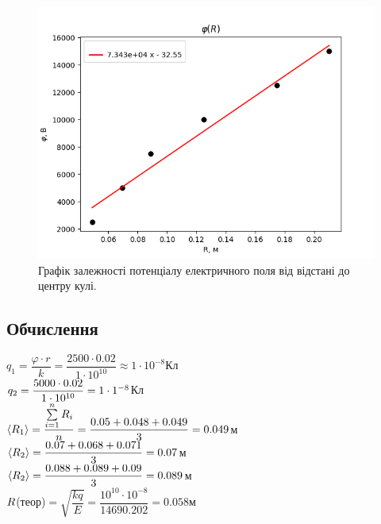 \documentclass[a4paper,12pt]{article}
\begin{document}
\newpage
	\begin{figure}[h!]
		\centering
		\begin{minipage}[h]{1\linewidth}
			\includegraphics[width=1\linewidth]{Prt sc/Figure_1.png}
			\caption{Графік залежності потенціалу електричного поля від відстані до центру кулі.}
			\label{Figure_1}
		\end{minipage}
	\end{figure}
	
	
	\subsection*{Обчислення}
	$q_1=\dfrac{\varphi\cdot r}{k}=\dfrac{2500\cdot0.02}{1\cdot10^{10}}\approx1\cdot10^{-8}$Кл \\
	$\\ q_2=\dfrac{5000\cdot0.02}{1\cdot10^{10}}=1\cdot1^{-8}$Кл \\
	$\\ \langle R_1\rangle=\dfrac{\sum\limits_{i=1}^{n}R_i}{n}=\dfrac{0.05+0.048+0.049}{3}=0.049$м \\
	$\\ \langle R_2\rangle=\dfrac{0.07+0.068+0.071}{3}=0.07$м \\
	$\\ \langle R_2\rangle=\dfrac{0.088+0.089+0.09}{3}=0.089$м \\
	$\\ R$(теор)$=\sqrt{\dfrac{kq}{E}}=\dfrac{10^{10}\cdot10^{-8}}{14690.202}=0.058$м
	
	
	
\end{document}

